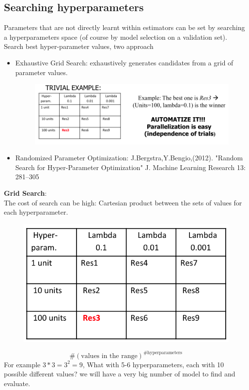 \documentclass[../main.tex]{subfiles}
\begin{document}
\subsection{Searching hyperparameters }
Parameters that are not directly learnt within estimators can be set by searching a hyperparameters space (of course by model selection on a validation set).
Search best hyper-parameter values, two approach
\begin{itemize}
    \item Exhaustive Grid Search: exhaustively generates candidates from a grid of parameter values.
    \begin{figure}[H]
        \centering
        \includegraphics[scale = 0.3]{lectures/5_validation/5_grid_s_1.png}
    \end{figure}
    \item Randomized Parameter Optimization: J.Bergstra,Y.Bengio,(2012). "Random Search for Hyper-Parameter Optimization" J. Machine Learning Research 13: 281–305
\end{itemize}
\noindent\textbf{Grid Search}:\\
The cost of search can be high: Cartesian product between the sets of values for each hyperparameter.
\begin{figure}[H]
    \centering
    \includegraphics[scale = 0.2]{lectures/5_validation/5_grid_s_2.png}
\end{figure}
$$\#(\text{values in the range})^{\#\text{hyperparameters}}$$
For example $3*3=3^2=9$, What with 5-6 hyperparameters, each with 10 possible different values? we will have a very big number of model to find and evaluate.\\
\end{document}

